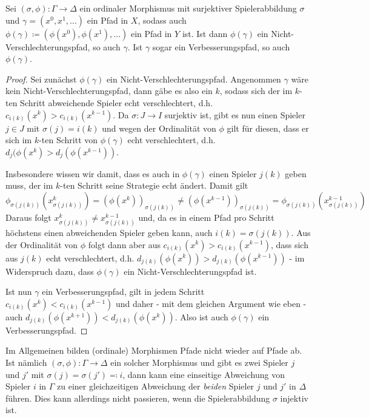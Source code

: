 
\begin{prop}\label{prop:NVReflVerbErh}
	Sei $(\sigma, \phi): \Gamma \to \Delta$ ein ordinaler Morphismus mit surjektiver Spielerabbildung $\sigma$ und $\gamma = (x^0, x^1, \dots)$ ein Pfad in $X$, sodass auch $\phi(\gamma) \coloneqq (\phi(x^0), \phi(x^1), \dots)$ ein Pfad in $Y$ ist. Ist dann $\phi(\gamma)$ ein Nicht-Verschlechterungspfad, so auch $\gamma$. Ist $\gamma$ sogar ein Verbesserungspfad, so auch $\phi(\gamma)$.
\end{prop}

\begin{proof}
	Sei zunächst $\phi(\gamma)$ ein Nicht-Verschlechterungspfad. Angenommen $\gamma$ wäre kein Nicht-Verschlechterungspfad, dann gäbe es also ein $k$, sodass sich der im $k$-ten Schritt abweichende Spieler echt verschlechtert, d.h. $c_{i(k)}(x^k) > c_{i(k)}(x^{k-1})$. Da $\sigma: J \to I$ surjektiv ist, gibt es nun einen Spieler $j \in J$ mit $\sigma(j) = i(k)$ und wegen der Ordinalität von $\phi$ gilt für diesen, dass er sich im $k$-ten Schritt von $\phi(\gamma)$ echt verschlechtert, d.h. $d_j(\phi(x^k) > d_j(\phi(x^{k-1}))$. 
	
	Insbesondere wissen wir damit, dass es auch in $\phi(\gamma)$ einen Spieler $j(k)$ geben muss, der im $k$-ten Schritt seine Strategie echt ändert. Damit gilt
		\[\phi_{\sigma(j(k))}\left(x_{\sigma(j(k))}^k\right) = \left(\phi(x^k)\right)_{\sigma(j(k))} \neq \left(\phi(x^{k-1})\right)_{\sigma(j(k))} = \phi_{\sigma(j(k))}\left(x_{\sigma(j(k))}^{k-1}\right)\]
	Daraus folgt $x_{\sigma(j(k))}^k \neq x_{\sigma(j(k))}^{k-1}$ und, da es in einem Pfad pro Schritt höchstens einen abweichenden Spieler geben kann, auch $i(k) = \sigma(j(k))$. Aus der Ordinalität von $\phi$ folgt dann aber aus $c_{i(k)}(x^k) > c_{i(k)}(x^{k-1})$, dass sich aus $j(k)$ echt verschlechtert, d.h. $d_{j(k)}(\phi(x^k)) > d_{j(k)}(\phi(x^{k-1}))$ - im Widerspruch dazu, dass $\phi(\gamma)$ ein Nicht-Verschlechterungspfad ist.

	Ist nun $\gamma$ ein Verbesserungspfad, gilt in jedem Schritt $c_{i(k)}(x^{k}) < c_{i(k)}(x^{k-1})$ und daher - mit dem gleichen Argument wie eben - auch $d_{j(k)}(\phi(x^{k+1})) < d_{j(k)}(\phi(x^k))$. Also ist auch $\phi(\gamma)$ ein Verbesserungspfad.
\end{proof}

Im Allgemeinen bilden (ordinale) Morphismen Pfade nicht wieder auf Pfade ab. Ist nämlich $(\sigma, \phi): \Gamma \to \Delta$ ein solcher Morphismus und gibt es zwei Spieler $j$ und $j'$ mit $\sigma(j) = \sigma(j') \eqqcolon i$, dann kann eine einseitige Abweichung von Spieler $i$ in $\Gamma$ zu einer gleichzeitigen Abweichung der \emph{beiden} Spieler $j$ und $j'$ in $\Delta$ führen. Dies kann allerdings nicht passieren, wenn die Spielerabbildung $\sigma$ injektiv ist. 

